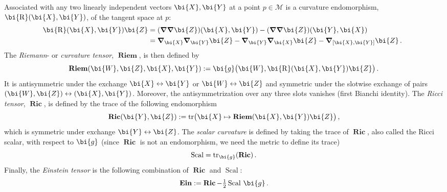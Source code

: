 \documentclass
[rmp,aps,twocolumn,showpacs,preprintnumbers,amsmath,amssymb]{revtex4}
\theoremstyle{plain}
\theoremstyle{definition}
\theoremstyle{remark}
\newcommand{\br}[1]{\mathbf{#1}}              %
\newcommand{\tr}{\mathrm{tr}}                 %
\DeclareMathOperator{\Riem}{\br{Riem}}        %
\DeclareMathOperator{\R}{\bi{R}}              %
\DeclareMathOperator{\Ric}{\br{Ric}}          %
\DeclareMathOperator{\Scal}{\mathrm{Scal}}    %
\DeclareMathOperator{\Ein}{\br{Ein}}          %
\newcommand{\bnabla}{\boldsymbol{\nabla}}     %
\newcommand{\M}{\mathcal{M}}                      %
\newcommand{\g}{\bg}                            %
\newcommand{\bg}{\bi{g}}
\newcommand{\bW}{\bi{W}}
\newcommand{\bX}{\bi{X}}
\newcommand{\bY}{\bi{Y}}
\newcommand{\bZ}{\bi{Z}}
\begin{document}
Associated with any two linearly independent vectors $\bX,\bY$ at 
a point $p\in\M$ is a curvature endomorphism, $\R(\bX,\bY)$, of 
the tangent space at $p$:
%
\begin{equation}\label{eq:CurvEnd}
\begin{split}
  \!\!\!\R(\bX,\bY)\bZ
  &=(\bnabla\bnabla\bZ)(\bX,\bY)-(\bnabla\bnabla\bZ)(\bY,\bX)\\
  &=\bnabla_\bX\bnabla_\bY\bZ-\bnabla_\bY\bnabla_\bX\bZ
   -\bnabla_{[\bX,\bY]}\bZ\,.\\
\end{split}
\end{equation}
%
The \emph{Riemann}- or \emph{curvature tensor}, $\Riem$, is then defined by
%
\begin{equation}\label{eq:DefRiem}
  \Riem(\bW,\bZ,\bX,\bY) := \bg\bigl(\bW,\R(\bX,\bY)\bZ\bigr)\,.
\end{equation}
%
It is antisymmetric under the exchange $\bX\leftrightarrow\bY$ or
$\bW\leftrightarrow\bZ$ and symmetric under the slotwise exchange 
of pairs $(\bW,\bZ)\leftrightarrow(\bX,\bY)$. Moreover, the 
antisymmetrization over any three slots vanishes (first Bianchi
identity). 
The \emph{Ricci tensor}, $\Ric$, is defined by the trace of the 
following endomorphism 
%
\begin{equation}\label{eq:DefRic}
  \Ric(\bY,\bZ):=\tr\bigl(\bX\mapsto\Riem(\bX,\bY)\bZ\bigr)\,,
\end{equation} 
%
which is symmetric under exchange $\bY\leftrightarrow\bZ$. 
The \emph{scalar curvature} is defined by taking the 
trace of $\Ric$, also called the Ricci scalar, with respect 
to $\g$ (since $\Ric$ is not an endomorphism, we need the 
metric to define its trace)
%
\begin{equation}\label{eq:DefScal}
  \Scal=\tr_\g(\Ric)\,.
\end{equation} 
%
Finally, the \emph{Einstein tensor} is the following combination 
of $\Ric$ and $\Scal$:
%
\begin{equation}\label{eq:DefEin}
  \Ein := \Ric - \tfrac{1}{2}\Scal\,\g \,.
\end{equation} 
%
\end{document}

